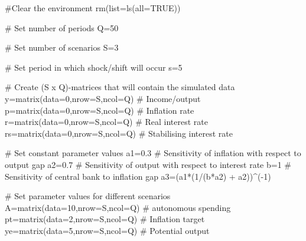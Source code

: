 \documentclass[
  letterpaper,
  DIV=11,
  numbers=noendperiod]{scrreprt}
\newenvironment{Shaded}{\begin{snugshade}}{\end{snugshade}}
\newcommand{\AttributeTok}[1]{\textcolor[rgb]{0.40,0.45,0.13}{#1}}
\newcommand{\CommentTok}[1]{\textcolor[rgb]{0.37,0.37,0.37}{#1}}
\newcommand{\ConstantTok}[1]{\textcolor[rgb]{0.56,0.35,0.01}{#1}}
\newcommand{\DecValTok}[1]{\textcolor[rgb]{0.68,0.00,0.00}{#1}}
\newcommand{\FloatTok}[1]{\textcolor[rgb]{0.68,0.00,0.00}{#1}}
\newcommand{\FunctionTok}[1]{\textcolor[rgb]{0.28,0.35,0.67}{#1}}
\newcommand{\NormalTok}[1]{\textcolor[rgb]{0.00,0.23,0.31}{#1}}
\newcommand{\OtherTok}[1]{\textcolor[rgb]{0.00,0.23,0.31}{#1}}
\newcommand{\SpecialCharTok}[1]{\textcolor[rgb]{0.37,0.37,0.37}{#1}}
\begin{document}
\begin{Shaded}
\begin{Highlighting}[]
\CommentTok{\#Clear the environment}
\FunctionTok{rm}\NormalTok{(}\AttributeTok{list=}\FunctionTok{ls}\NormalTok{(}\AttributeTok{all=}\ConstantTok{TRUE}\NormalTok{))}

\CommentTok{\# Set number of periods}
\NormalTok{Q}\OtherTok{=}\DecValTok{50}

\CommentTok{\# Set number of scenarios}
\NormalTok{S}\OtherTok{=}\DecValTok{3}

\CommentTok{\# Set period in which shock/shift will occur}
\NormalTok{s}\OtherTok{=}\DecValTok{5}

\CommentTok{\# Create (S x Q){-}matrices that will contain the simulated data}
\NormalTok{y}\OtherTok{=}\FunctionTok{matrix}\NormalTok{(}\AttributeTok{data=}\DecValTok{0}\NormalTok{,}\AttributeTok{nrow=}\NormalTok{S,}\AttributeTok{ncol=}\NormalTok{Q) }\CommentTok{\# Income/output}
\NormalTok{p}\OtherTok{=}\FunctionTok{matrix}\NormalTok{(}\AttributeTok{data=}\DecValTok{0}\NormalTok{,}\AttributeTok{nrow=}\NormalTok{S,}\AttributeTok{ncol=}\NormalTok{Q) }\CommentTok{\# Inflation rate}
\NormalTok{r}\OtherTok{=}\FunctionTok{matrix}\NormalTok{(}\AttributeTok{data=}\DecValTok{0}\NormalTok{,}\AttributeTok{nrow=}\NormalTok{S,}\AttributeTok{ncol=}\NormalTok{Q) }\CommentTok{\# Real interest rate}
\NormalTok{rs}\OtherTok{=}\FunctionTok{matrix}\NormalTok{(}\AttributeTok{data=}\DecValTok{0}\NormalTok{,}\AttributeTok{nrow=}\NormalTok{S,}\AttributeTok{ncol=}\NormalTok{Q) }\CommentTok{\# Stabilising interest rate}

\CommentTok{\# Set constant parameter values}
\NormalTok{a1}\OtherTok{=}\FloatTok{0.3}  \CommentTok{\# Sensitivity of inflation with respect to output gap }
\NormalTok{a2}\OtherTok{=}\FloatTok{0.7}  \CommentTok{\# Sensitivity of output with respect to interest rate}
\NormalTok{b}\OtherTok{=}\DecValTok{1}     \CommentTok{\# Sensitivity of central bank to inflation gap}
\NormalTok{a3}\OtherTok{=}\NormalTok{(a1}\SpecialCharTok{*}\NormalTok{(}\DecValTok{1}\SpecialCharTok{/}\NormalTok{(b}\SpecialCharTok{*}\NormalTok{a2) }\SpecialCharTok{+}\NormalTok{ a2))}\SpecialCharTok{\^{}}\NormalTok{(}\SpecialCharTok{{-}}\DecValTok{1}\NormalTok{)}

\CommentTok{\# Set parameter values for different scenarios}
\NormalTok{A}\OtherTok{=}\FunctionTok{matrix}\NormalTok{(}\AttributeTok{data=}\DecValTok{10}\NormalTok{,}\AttributeTok{nrow=}\NormalTok{S,}\AttributeTok{ncol=}\NormalTok{Q) }\CommentTok{\# autonomous spending}
\NormalTok{pt}\OtherTok{=}\FunctionTok{matrix}\NormalTok{(}\AttributeTok{data=}\DecValTok{2}\NormalTok{,}\AttributeTok{nrow=}\NormalTok{S,}\AttributeTok{ncol=}\NormalTok{Q) }\CommentTok{\# Inflation target}
\NormalTok{ye}\OtherTok{=}\FunctionTok{matrix}\NormalTok{(}\AttributeTok{data=}\DecValTok{5}\NormalTok{,}\AttributeTok{nrow=}\NormalTok{S,}\AttributeTok{ncol=}\NormalTok{Q) }\CommentTok{\# Potential output}


\end{Highlighting}
\end{Shaded}
\end{document}
